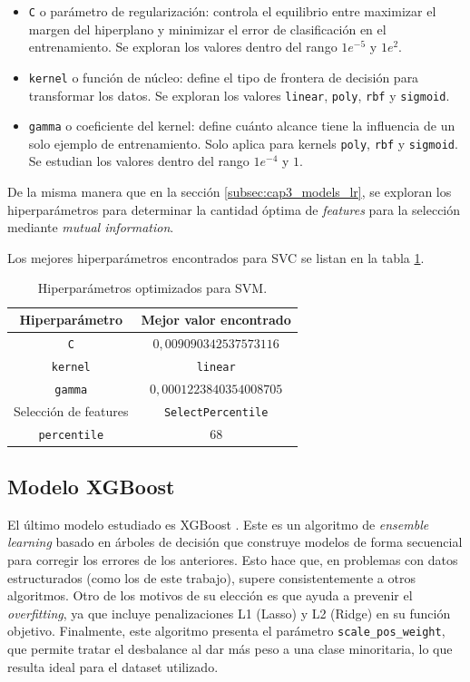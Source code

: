 \begin{itemize}
    \item \texttt{C} o parámetro de regularización: controla el equilibrio entre maximizar el margen del hiperplano y minimizar el error de clasificación en el entrenamiento. Se exploran los valores dentro del rango $1e^{-5}$ y $1e^{2}$.
    \item \texttt{kernel} o función de núcleo: define el tipo de frontera de decisión para transformar los datos. Se exploran los valores \texttt{linear}, \texttt{poly}, \texttt{rbf} y \texttt{sigmoid}.
    \item \texttt{gamma} o coeficiente del kernel: define cuánto alcance tiene la influencia de un solo ejemplo de entrenamiento. Solo aplica para kernels \texttt{poly}, \texttt{rbf} y \texttt{sigmoid}. Se estudian los valores dentro del rango  $1e^{-4}$ y $1$.
\end{itemize}

De la misma manera que en la sección \ref{subsec:cap3_models_lr}, se exploran los hiperparámetros para determinar la cantidad óptima de \textit{features} para la selección mediante \textit{mutual information}.

Los mejores hiperparámetros encontrados para SVC se listan en la tabla \ref{tab:svm-hip}.

\begin{table}[h]
	\centering
	\caption[Hiperparámetros - SVM]{Hiperparámetros optimizados para SVM.}
	\begin{tabular}{c c}
		\toprule
		\textbf{Hiperparámetro} 	 & \textbf{Mejor valor encontrado} \\
		\midrule
        \texttt{C} & $0,009090342537573116$ \\
        \texttt{kernel} & \texttt{linear} \\
        \texttt{gamma} & $0,0001223840354008705$ \\
        Selección de features & \texttt{SelectPercentile} \\
        \texttt{percentile} &  $68$ \\
		\bottomrule
		\hline
	\end{tabular}
	\label{tab:svm-hip}
\end{table}

\subsection{Modelo XGBoost}

El último modelo estudiado es XGBoost \citep{model:xgboost}. Este es un algoritmo de \textit{ensemble learning} basado en árboles de decisión que construye modelos de forma secuencial para corregir los errores de los anteriores. Esto hace que, en problemas con datos estructurados (como los de este trabajo), supere consistentemente a otros algoritmos. Otro de los motivos de su elección es que ayuda a prevenir el \textit{overfitting}, ya que incluye penalizaciones L1 (Lasso) y L2 (Ridge) en su función objetivo. Finalmente, este algoritmo presenta el parámetro \texttt{scale\_pos\_weight}, que permite tratar el desbalance al dar más peso a una clase minoritaria, lo que resulta ideal para el dataset utilizado.

